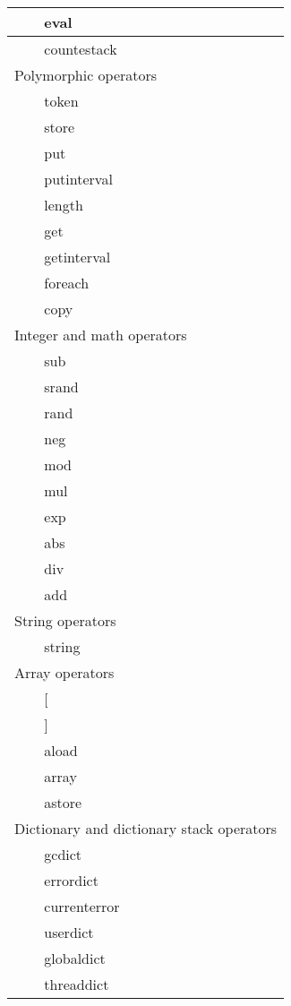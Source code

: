 \begin{longtable}{|r|l|l|p{4in}|}
\hline
& eval & & \\
\hline
& countestack & & \\
\hline \hline
\multicolumn{4}{|l|}{Polymorphic operators} \\
\hline \hline
& token & & \\
\hline
& store & & \\
\hline
& put & & \\
\hline
& putinterval & & \\
\hline
& length & & \\
\hline
& get & & \\
\hline
& getinterval & & \\
\hline
& foreach & & \\
\hline
& copy & & \\
\hline \hline
\multicolumn{4}{|l|}{Integer and math operators} \\
\hline \hline
& sub & & \\
\hline
& srand & & \\
\hline
& rand & & \\
\hline
& neg & & \\
\hline
& mod & & \\
\hline
& mul & & \\
\hline
& exp & & \\
\hline
& abs & & \\
\hline
& div & & \\
\hline
& add & & \\
\hline \hline
\multicolumn{4}{|l|}{String operators} \\
\hline \hline
& string & & \\
\hline \hline
\multicolumn{4}{|l|}{Array operators} \\
\hline \hline
& [ & & \\
\hline
& ] & & \\
\hline
& aload & & \\
\hline
& array & & \\
\hline
& astore & & \\
\hline \hline
\multicolumn{4}{|l|}{Dictionary and dictionary stack operators} \\
\hline \hline
& gcdict & & \\
\hline
& errordict & & \\
\hline
& currenterror & & \\
\hline
& userdict & & \\
\hline
& globaldict & & \\
\hline
& threaddict & & \\

\end{longtable}
